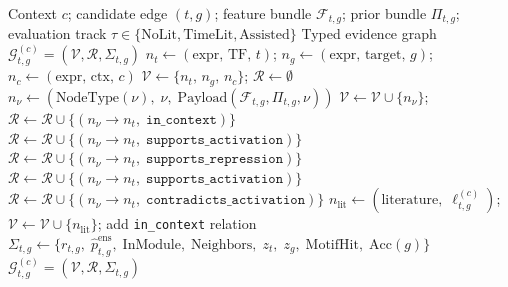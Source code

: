 \documentclass{article}
\begin{document}
\begin{algorithm}[H]
\caption{Evidence Graph Construction}
\label{alg:evidencegraph}
\begin{algorithmic}[1]
\Require Context $c$; candidate edge $(t,g)$;
         feature bundle $\mathcal{F}_{t,g}$; prior bundle $\Pi_{t,g}$;
         evaluation track $\tau \in \{\text{NoLit},\text{TimeLit},\text{Assisted}\}$
\Ensure  Typed evidence graph $\mathcal{G}_{t,g}^{(c)} = (\mathcal{V},\mathcal{R},\Sigma_{t,g})$
\State $n_t \leftarrow (\text{expr},\,\text{TF},\,t)$;\;
       $n_g \leftarrow (\text{expr},\,\text{target},\,g)$;\;
       $n_c \leftarrow (\text{expr},\,\text{ctx},\,c)$
\State $\mathcal{V} \leftarrow \{n_t,\, n_g,\, n_c\}$;\; $\mathcal{R} \leftarrow \emptyset$
  \State $n_\nu \leftarrow (\mathrm{NodeType}(\nu),\;\nu,\;\mathrm{Payload}(\mathcal{F}_{t,g},\Pi_{t,g},\nu))$
  \State $\mathcal{V} \leftarrow \mathcal{V} \cup \{n_\nu\}$;\;
         $\mathcal{R} \leftarrow \mathcal{R} \cup \{(n_\nu \!\to\! n_t,\;\texttt{in\_context})\}$
    \State $\mathcal{R} \leftarrow \mathcal{R} \cup \{(n_\nu \!\to\! n_t,\;\texttt{supports\_activation})\}$
  \EndIf
    \State $\mathcal{R} \leftarrow \mathcal{R} \cup \{(n_\nu \!\to\! n_t,\;\texttt{supports\_repression})\}$
  \EndIf
    \State $\mathcal{R} \leftarrow \mathcal{R} \cup \{(n_\nu \!\to\! n_t,\;\texttt{supports\_activation})\}$
  \EndIf
    \State $\mathcal{R} \leftarrow \mathcal{R} \cup \{(n_\nu \!\to\! n_t,\;\texttt{contradicts\_activation})\}$
  \EndIf
\EndFor
{}
  \State $n_{\mathrm{lit}} \leftarrow (\text{literature},\;\ell_{t,g}^{(c)})$;\;
         $\mathcal{V} \leftarrow \mathcal{V} \cup \{n_{\mathrm{lit}}\}$;\;
         add \texttt{in\_context} relation
\EndIf
\State $\Sigma_{t,g} \leftarrow \{r_{t,g},\;\hat{p}^{\mathrm{ens}}_{t,g},\;\mathrm{InModule},\;\mathrm{Neighbors},\;z_t,\;z_g,\;\mathrm{MotifHit},\;\mathrm{Acc}(g)\}$
\State \Return $\mathcal{G}_{t,g}^{(c)} = (\mathcal{V}, \mathcal{R}, \Sigma_{t,g})$
\end{algorithmic}
\end{algorithm}
\end{document}
